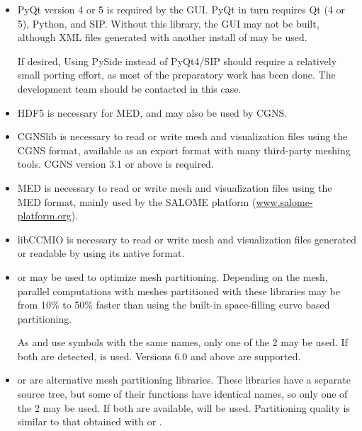 \documentclass[a4paper,10pt,twoside]{csshortdoc}
\begin{document}
\begin{itemize}

\item PyQt version 4 or 5 is required by the \CS GUI. PyQt in turn requires
      Qt (4 or 5), Python, and SIP. Without this library, the GUI may not be
      built, although XML files generated with another install of \CS
      may be used.

      If desired, Using PySide instead of PyQt4/SIP should require a relatively
      small porting effort, as most of the preparatory work has been done.
      The development team should be contacted in this case.

\item HDF5 is necessary for MED, and may also be used by CGNS.

\item CGNSlib is necessary to read or write mesh and visualization files
      using the CGNS format, available as an export format with many
      third-party meshing tools. CGNS version 3.1 or above is required.

\item MED is necessary to read or write mesh and visualization files
      using the MED format, mainly used by the SALOME platform
      (\url{www.salome-platform.org}).

\item libCCMIO is necessary to read or write mesh and visualization files
      generated or readable by \starccmp using its native format.

\item \scotch or \ptscotch may be used to optimize mesh partitioning.
      Depending on the mesh, parallel computations with meshes partitioned
      with these libraries may be from 10\% to 50\% faster than using the
      built-in space-filling curve based partitioning.

      As \scotch and \ptscotch use symbols with the same names, only
      one of the 2 may be used. If both are detected, \ptscotch is used.
      Versions 6.0 and above are supported.

\item \metis or \parmetis are alternative mesh partitioning libraries.
      These libraries have a separate source tree, but some of their
      functions have identical names, so only one of the 2 may be used.
      If both are available, \parmetis will be used. Partitioning
      quality is similar to that obtained with \scotch or
      \ptscotch.


\end{itemize}
\end{document}
